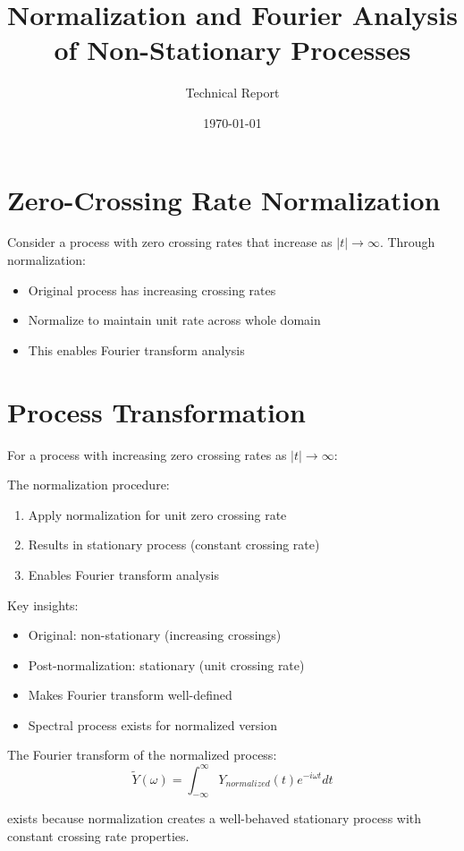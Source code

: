 \documentclass[12pt]{article}
\title{Normalization and Fourier Analysis of Non-Stationary Processes}
\author{Technical Report}
\date{\today}
\begin{document}
\maketitle

\section{Zero-Crossing Rate Normalization}
Consider a process with zero crossing rates that increase as $|t| \to \infty$. Through normalization:

\begin{itemize}
\item Original process has increasing crossing rates
\item Normalize to maintain unit rate across whole domain
\item This enables Fourier transform analysis
\end{itemize}

\section{Process Transformation}
For a process with increasing zero crossing rates as $|t| \to \infty$:

The normalization procedure:
\begin{enumerate}
\item Apply normalization for unit zero crossing rate
\item Results in stationary process (constant crossing rate)
\item Enables Fourier transform analysis
\end{enumerate}

Key insights:
\begin{itemize}
\item Original: non-stationary (increasing crossings)
\item Post-normalization: stationary (unit crossing rate)
\item Makes Fourier transform well-defined
\item Spectral process exists for normalized version
\end{itemize}

The Fourier transform of the normalized process:
\[ \tilde{Y}(\omega) = \int_{-\infty}^{\infty} Y_{normalized}(t)e^{-i\omega t}dt \]

exists because normalization creates a well-behaved stationary process with constant crossing rate properties.
\end{document}
